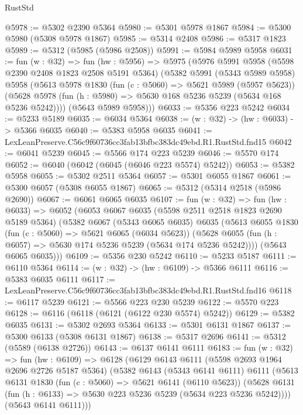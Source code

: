 \begin{lexlean}{RustStd}
\begin{coremodule}
@5978 := @5302 @2390 @5364
@5980 := @5301 @5978 @1867
@5984 := @5300 @5980 (@5308 @5978 @1867)
@5985 := @5314 @2408
@5986 := @5317 @1823
@5989 := @5312 (@5985 (@5986 @2508))
@5991 := @5984 @5989 @5958
@6031 := fun (w : @32) =>
  fun (hw : @5956) =>
  @5975
    (@5976
      @5991
      @5958
      (@5598 @2390 @2408 @1823 @2508 @5191 @5364)
      (@5382
        @5991
        (@5343 @5989 @5958)
        @5958
        (@5613
          @5978
          @1830
          (fun (c : @5060) => @5621 @5989 (@5957 @5623))
          (@5628 @5978 (fun (h : @5980) => @5630 @168 @5236 @5239 (@5634 @168 @5236 @5242))))
        (@5643 @5989 @5958)))
@6033 := @5356 @223 @5242
@6034 := @5233 @5189
@6035 := @6034 @5364
@6038 := (w : @32) -> (hw : @6033) -> @5366 @6035
@6040 := @5383 @5958 @6035
@6041 := LexLeanPreserve.C56c9f60736cc3fab13bfbc383dc49ebd.R1.RustStd.fnd15
@6042 := @6041 @5239
@6045 := @5566 @174 @223 @5239
@6046 := @5570 @174
@6052 := @6040 (@6042 (@6045 (@6046 @223 @5574) @5242))
@6053 := @5382 @5958
@6055 := @5302 @2511 @5364
@6057 := @5301 @6055 @1867
@6061 := @5300 @6057 (@5308 @6055 @1867)
@6065 := @5312 (@5314 @2518 (@5986 @2690))
@6067 := @6061 @6065 @6035
@6107 := fun (w : @32) =>
  fun (hw : @6033) =>
  @6052
    (@6053
      @6067
      @6035
      (@5598 @2511 @2518 @1823 @2690 @5189 @5364)
      (@5382
        @6067
        (@5343 @6065 @6035)
        @6035
        (@5613
          @6055
          @1830
          (fun (c : @5060) => @5621 @6065 (@6034 @5623))
          (@5628 @6055 (fun (h : @6057) => @5630 @174 @5236 @5239 (@5634 @174 @5236 @5242))))
        (@5643 @6065 @6035)))
@6109 := @5356 @230 @5242
@6110 := @5233 @5187
@6111 := @6110 @5364
@6114 := (w : @32) -> (hw : @6109) -> @5366 @6111
@6116 := @5383 @6035 @6111
@6117 := LexLeanPreserve.C56c9f60736cc3fab13bfbc383dc49ebd.R1.RustStd.fnd16
@6118 := @6117 @5239
@6121 := @5566 @223 @230 @5239
@6122 := @5570 @223
@6128 := @6116 (@6118 (@6121 (@6122 @230 @5574) @5242))
@6129 := @5382 @6035
@6131 := @5302 @2693 @5364
@6133 := @5301 @6131 @1867
@6137 := @5300 @6133 (@5308 @6131 @1867)
@6138 := @5317 @2696
@6141 := @5312 (@5589 (@6138 @2726))
@6143 := @6137 @6141 @6111
@6183 := fun (w : @32) =>
  fun (hw : @6109) =>
  @6128
    (@6129
      @6143
      @6111
      (@5598 @2693 @1964 @2696 @2726 @5187 @5364)
      (@5382
        @6143
        (@5343 @6141 @6111)
        @6111
        (@5613
          @6131
          @1830
          (fun (c : @5060) => @5621 @6141 (@6110 @5623))
          (@5628 @6131 (fun (h : @6133) => @5630 @223 @5236 @5239 (@5634 @223 @5236 @5242))))
        (@5643 @6141 @6111)))

\end{coremodule}
\end{lexlean}
